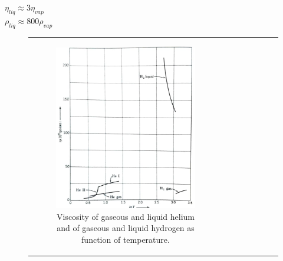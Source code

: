 \documentclass{article}
\begin{document}
$\eta_{liq} \approx 3 \eta_{vap}$
\\

$\rho_{liq} \approx 800 \rho_{vap}$
\\




\begin{figure}[H]
    \centering
    \begin{tabular}{cc}
        \begin{subfigure}{0.5\textwidth}
            \centering
            \includegraphics[width=\linewidth]{Images/Viscosity.png}
            \caption{Viscosity of gaseous and liquid helium and of gaseous and liquid hydrogen as function of temperature.}
            \label{fig:enter-label}
        \end{subfigure} &
        \begin{subfigure}{0.5\textwidth}
            \centering

\end{subfigure}
\end{tabular}
\end{figure}
\end{document}
